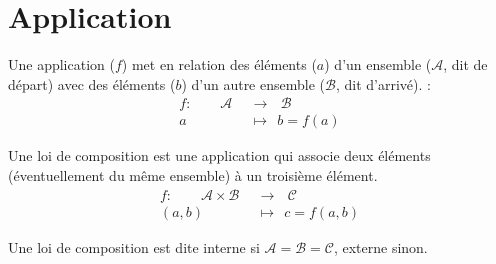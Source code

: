
\section{Application}
Une application ($f$) met en relation des éléments ($a$) d'un ensemble ($\mathcal{A}$, dit de départ) avec des éléments ($b$) d'un autre ensemble ($\mathcal{B}$, dit d'arrivé). :
\begin{align*}
f :\ \ \ \ \ \ \ \ \ \mathcal{A} \ \  & \rightarrow \ \ \ \mathcal{B} \\
a \ \ & \mapsto \ \ b = f(a)
\end{align*}

Une loi de composition est une application qui associe deux éléments (éventuellement du même ensemble) à un troisième élément. 
\begin{align*}
f :\ \ \ \ \ \ \ \ \ \mathcal{A} \times \mathcal{B} \ \  & \rightarrow \ \ \ \mathcal{C} \\
(a,b) \ \ & \mapsto \ \ c = f(a,b)
\end{align*}

Une loi de composition est dite interne si $\mathcal{A} = \mathcal{B} = \mathcal{C}$, externe sinon.

